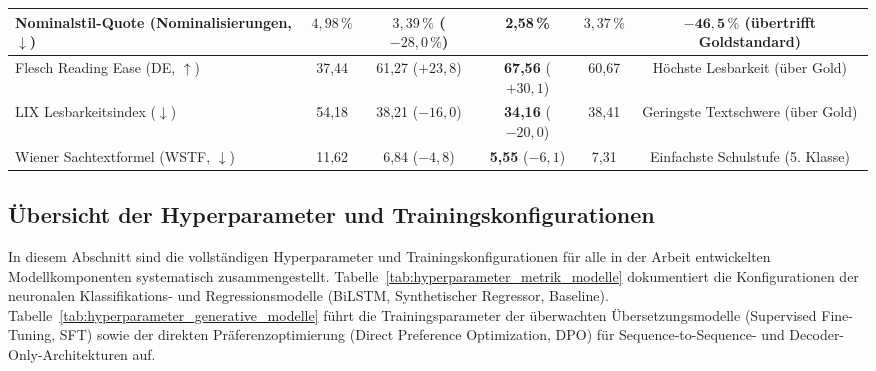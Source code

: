 \begin{table}[htbp]
{\begin{tabular}{@{}lccccc@{}}
Nominalstil-Quote (Nominalisierungen, $\downarrow$) & $4{,}98\,\%$ & $3{,}39\,\%$ ($-28{,}0\,\%$) & \textbf{2,58\,\%} & $3{,}37\,\%$ & $\mathbf{-46{,}5\,\%}$ (übertrifft Goldstandard) \\
\midrule
Flesch Reading Ease (DE, $\uparrow$) & 37,44 & 61,27 ($+23{,}8$) & \textbf{67,56} ($+30{,}1$) & 60,67 & Höchste Lesbarkeit (über Gold) \\
LIX Lesbarkeitsindex ($\downarrow$) & 54,18 & 38,21 ($-16{,}0$) & \textbf{34,16} ($-20{,}0$) & 38,41 & Geringste Textschwere (über Gold) \\
Wiener Sachtextformel (WSTF, $\downarrow$) & 11,62 & 6,84 ($-4{,}8$) & \textbf{5,55} ($-6{,}1$) & 7,31 & Einfachste Schulstufe (5. Klasse) \\
\bottomrule
\end{tabular}}
\end{table}

\newpage
\subsection{Übersicht der Hyperparameter und Trainingskonfigurationen}
\label{sec:anhang_hyperparameter}

In diesem Abschnitt sind die vollständigen Hyperparameter und Trainingskonfigurationen für alle in der Arbeit entwickelten Modellkomponenten systematisch zusammengestellt. Tabelle~\ref{tab:hyperparameter_metrik_modelle} dokumentiert die Konfigurationen der neuronalen Klassifikations- und Regressionsmodelle (BiLSTM, Synthetischer Regressor, Baseline). Tabelle~\ref{tab:hyperparameter_generative_modelle} führt die Trainingsparameter der überwachten Übersetzungsmodelle (Supervised Fine-Tuning, SFT) sowie der direkten Präferenzoptimierung (Direct Preference Optimization, DPO) für Sequence-to-Sequence- und Decoder-Only-Architekturen auf.

